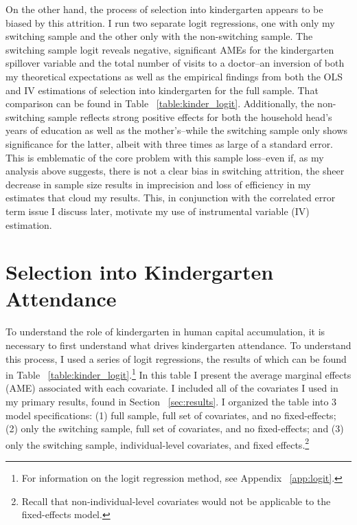 On the other hand, the process of selection into kindergarten appears to be biased by this attrition. I run two separate logit regressions, one with only my switching sample and the other only with the non-switching sample. The switching sample logit reveals negative, significant AMEs for the kindergarten spillover variable and the total number of visits to a doctor--an inversion of both my theoretical expectations as well as the empirical findings from both the OLS and IV estimations of selection into kindergarten for the full sample. That comparison can be found in Table ~\ref{table:kinder_logit}. Additionally, the non-switching sample reflects strong positive effects for both the household head's years of education as well as the mother's--while the switching sample only shows significance for the latter, albeit with three times as large of a standard error. This is emblematic of the core problem with this sample loss--even if, as my analysis above suggests, there is not a clear bias in switching attrition, the sheer decrease in sample size results in imprecision and loss of efficiency in my estimates that cloud my results. This, in conjunction with the correlated error term issue I discuss later, motivate my use of instrumental variable (IV) estimation.

\section{Selection into Kindergarten Attendance}
	\label{app:kinder_sel}
To understand the role of kindergarten in human capital accumulation, it is necessary to first understand what drives kindergarten attendance. To understand this process, I used a series of logit regressions, the results of which can be found in Table ~\ref{table:kinder_logit}.\footnote{For information on the logit regression method, see Appendix ~\ref{app:logit}.} In this table I present the average marginal effects (AME) associated with each covariate. I included all of the covariates I used in my primary results, found in Section ~\ref{sec:results}. I organized the table into 3 model specifications: (1) full sample, full set of covariates, and no fixed-effects; (2) only the switching sample, full set of covariates, and no fixed-effects; and (3) only the switching sample, individual-level covariates, and fixed effects.\footnote{Recall that non-individual-level covariates would not be applicable to the fixed-effects model.}

